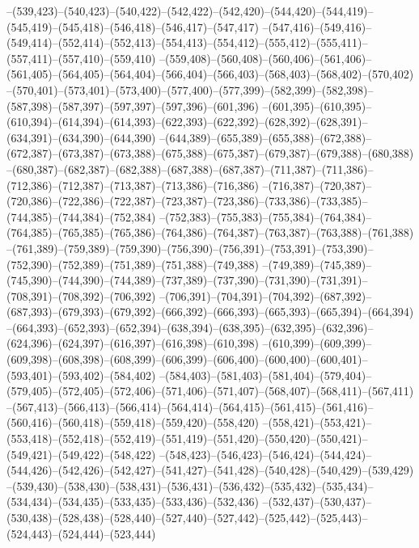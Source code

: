 --(539,423)--(540,423)--(540,422)--(542,422)--(542,420)--(544,420)--(544,419)--(545,419)--(545,418)--(546,418)--(546,417)--(547,417)
--(547,416)--(549,416)--(549,414)--(552,414)--(552,413)--(554,413)--(554,412)--(555,412)--(555,411)--(557,411)--(557,410)--(559,410)
--(559,408)--(560,408)--(560,406)--(561,406)--(561,405)--(564,405)--(564,404)--(566,404)--(566,403)--(568,403)--(568,402)--(570,402)
--(570,401)--(573,401)--(573,400)--(577,400)--(577,399)--(582,399)--(582,398)--(587,398)--(587,397)--(597,397)--(597,396)--(601,396)
--(601,395)--(610,395)--(610,394)--(614,394)--(614,393)--(622,393)--(622,392)--(628,392)--(628,391)--(634,391)--(634,390)--(644,390)
--(644,389)--(655,389)--(655,388)--(672,388)--(672,387)--(673,387)--(673,388)--(675,388)--(675,387)--(679,387)--(679,388)--(680,388)
--(680,387)--(682,387)--(682,388)--(687,388)--(687,387)--(711,387)--(711,386)--(712,386)--(712,387)--(713,387)--(713,386)--(716,386)
--(716,387)--(720,387)--(720,386)--(722,386)--(722,387)--(723,387)--(723,386)--(733,386)--(733,385)--(744,385)--(744,384)--(752,384)
--(752,383)--(755,383)--(755,384)--(764,384)--(764,385)--(765,385)--(765,386)--(764,386)--(764,387)--(763,387)--(763,388)--(761,388)
--(761,389)--(759,389)--(759,390)--(756,390)--(756,391)--(753,391)--(753,390)--(752,390)--(752,389)--(751,389)--(751,388)--(749,388)
--(749,389)--(745,389)--(745,390)--(744,390)--(744,389)--(737,389)--(737,390)--(731,390)--(731,391)--(708,391)--(708,392)--(706,392)
--(706,391)--(704,391)--(704,392)--(687,392)--(687,393)--(679,393)--(679,392)--(666,392)--(666,393)--(665,393)--(665,394)--(664,394)
--(664,393)--(652,393)--(652,394)--(638,394)--(638,395)--(632,395)--(632,396)--(624,396)--(624,397)--(616,397)--(616,398)--(610,398)
--(610,399)--(609,399)--(609,398)--(608,398)--(608,399)--(606,399)--(606,400)--(600,400)--(600,401)--(593,401)--(593,402)--(584,402)
--(584,403)--(581,403)--(581,404)--(579,404)--(579,405)--(572,405)--(572,406)--(571,406)--(571,407)--(568,407)--(568,411)--(567,411)
--(567,413)--(566,413)--(566,414)--(564,414)--(564,415)--(561,415)--(561,416)--(560,416)--(560,418)--(559,418)--(559,420)--(558,420)
--(558,421)--(553,421)--(553,418)--(552,418)--(552,419)--(551,419)--(551,420)--(550,420)--(550,421)--(549,421)--(549,422)--(548,422)
--(548,423)--(546,423)--(546,424)--(544,424)--(544,426)--(542,426)--(542,427)--(541,427)--(541,428)--(540,428)--(540,429)--(539,429)
--(539,430)--(538,430)--(538,431)--(536,431)--(536,432)--(535,432)--(535,434)--(534,434)--(534,435)--(533,435)--(533,436)--(532,436)
--(532,437)--(530,437)--(530,438)--(528,438)--(528,440)--(527,440)--(527,442)--(525,442)--(525,443)--(524,443)--(524,444)--(523,444)
